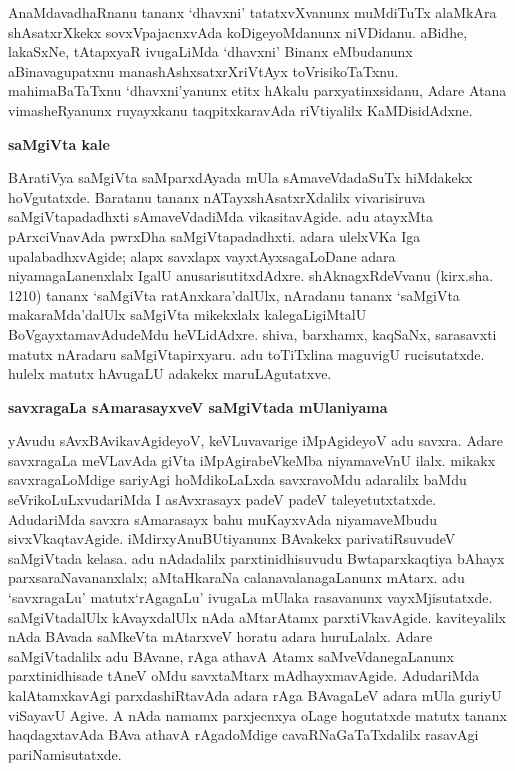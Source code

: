 AnaMdavadhaRnanu tananx `dhavxni' tatatxvXvanunx muMdiTuTx alaMkAra shAsatxrXkekx sovxVpajacnx\-vAda koDigeyoMdanunx niVDidanu. aBidhe, lakaSxNe, tAtapxyaR ivugaLiMda `dhavxni' Binanx eMbudanunx aBinavagupatxnu manashAshxsatxrXriVtAyx toVrisikoTaTxnu. mahimaBaTaTxnu `dhavxni'yanunx etitx hAkalu parxyatinxsidanu, Adare Atana vimasheRyanunx ruyayxkanu taqpitxkaravAda riVtiyalilx KaMDisidAdxne.

\newpage

\begin{center}
{\Large\bf saMgiVta kale}
\end{center}

BAratiVya saMgiVta saMparxdAyada mUla sAmaveVdadaSuTx hiMdakekx hoVgutatxde. Baratanu tananx nATayxshAsatxrXdalilx vivarisiruva saMgiVtapadadhxti sAmaveVdadiMda vikasita\-vAgide. adu atayxMta pArxciVnavAda pwrxDha saMgiVtapadadhxti. adara ulelxVKa Iga upa\-labadhxvAgide; alapx savxlapx vayxtAyxsagaLoDane adara niyamagaLanenxlalx IgalU anusarisu\-titxdAdxre. shAknagxRdeVvanu (kirx.sha. 1210) tananx `saMgiVta ratAnxkara'dalUlx, nAradanu tananx `saMgiVta makaraMda'dalUlx saMgiVta mikekxlalx kalegaLigiMtalU BoVgayxtamavAdudeMdu heVLidAdxre. shiva, barxhamx, kaqSaNx, sarasavxti matutx nAradaru saMgiVtapirxyaru. adu toTiTxlina maguvigU rucisutatxde. hulelx matutx hAvugaLU adakekx maruLAgutatxve.

\begin{center}
{\Large\bf savxragaLa sAmarasayxveV saMgiVtada mUlaniyama}
\end{center}

yAvudu sAvxBAvikavAgideyoV, keVLuvavarige iMpAgideyoV adu savxra. Adare savxragaLa meVLavAda giVta iMpAgirabeVkeMba niyamaveVnU ilalx. mikakx savxra\-gaLoMdige sariyAgi hoMdikoLaLxda savxravoMdu adaralilx baMdu seVrikoLuLxvudariMda I asAvx\-rasayx padeV padeV taleyetutxtatxde. AdudariMda savxra sAmarasayx bahu muKayx\-vAda niyama\-veMbudu sivxVkaqtavAgide. iMdirxyAnuBUtiyanunx BAvakekx parivatiRsuvudeV saMgiVtada kelasa. adu nAdadalilx parxtinidhisuvudu Bwtaparxkaqtiya bAhayx parxsaraNavananxlalx; aMtaHkaraNa calanavalanagaLanunx mAtarx. adu `savxragaLu' matutx\break `rAgagaLu' ivugaLa mUlaka rasavanunx vayxMjisutatxde. saMgiVtadalUlx kAvayxdalUlx nAda aMtarAtamx parxtiVka\-vAgide. kaviteyalilx nAda BAvada saMkeVta mAtarxveV horatu adara huruLalalx. Adare saMgiVtadalilx adu BAvane, rAga athavA Atamx saMveVdanegaLanunx parxtinidhisade tAneV oMdu savxtaMtarx mAdhayxmavAgide. AdudariMda kalAtamxkavAgi parxdashiRta\-vAda adara rAga BAvagaLeV adara mUla guriyU viSayavU Agive. A nAda namamx parxjecnxya oLage hogutatxde matutx tananx haqdagxtavAda BAva athavA rAgadoMdige cavaRNaGaTaTxdalilx rasavAgi pariNamisutatxde.

